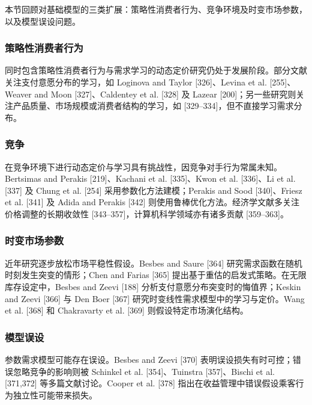 本节回顾对基础模型的三类扩展：策略性消费者行为、竞争环境及时变市场参数，以及模型误设问题。

\subsubsection{策略性消费者行为}\label{strategic-consumer-behavior}

同时包含策略性消费者行为与需求学习的动态定价研究仍处于发展阶段。部分文献关注支付意愿分布的学习，如 Loginova and Taylor [326]、Levina et al. [255]、Weaver and Moon [327]、Caldentey et al. [328] 及 Lazear [200]；另一些研究则关注产品质量、市场规模或消费者结构的学习，如 [329–334]，但不直接学习需求分布。

\subsubsection{竞争}\label{competition}

在竞争环境下进行动态定价与学习具有挑战性，因竞争对手行为常属未知。Bertsimas and Perakis [219]、Kachani et al. [335]、Kwon et al. [336]、Li et al. [337] 及 Chung et al. [254] 采用参数化方法建模；Perakis and Sood [340]、Friesz et al. [341] 及 Adida and Perakis [342] 则使用鲁棒优化方法。经济学文献多关注价格调整的长期收敛性 [343–357]，计算机科学领域亦有诸多贡献 [359–363]。

\subsubsection{时变市场参数}\label{time-varying-market-parameters}

近年研究逐步放松市场平稳性假设。Besbes and Saure [364] 研究需求函数在随机时刻发生突变的情形；Chen and Farias [365] 提出基于重估的启发式策略。在无限库存设定中，Besbes and Zeevi [188] 分析支付意愿分布突变时的悔值界；Keskin and Zeevi [366] 与 Den Boer [367] 研究时变线性需求模型中的学习与定价。Wang et al. [368] 和 Chakravarty et al. [369] 则假设特定市场演化结构。

\subsubsection{模型误设}\label{model-misspecification}

参数需求模型可能存在误设。Besbes and Zeevi [370] 表明误设损失有时可控；错误忽略竞争的影响则被 Schinkel et al. [354]、Tuinstra [357]、Bischi et al. [371,372] 等多篇文献讨论。Cooper et al. [378] 指出在收益管理中错误假设乘客行为独立性可能带来损失。


